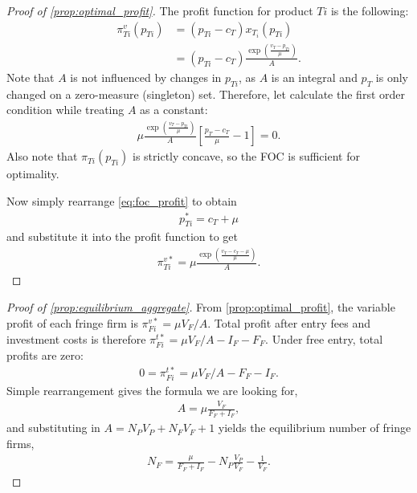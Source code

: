 \documentclass[a4paper]{article}
\begin{document}
\begin{proof}[Proof of \cref{prop:optimal_profit}]
    The profit function for product $Ti$ is the following:
    \begin{align*}
        \pi^v_{Ti}(p_{Ti}) &= (p_{Ti} - c_T) x_{T_i}(p_{Ti}) \\
        &= (p_{Ti} - c_T) \frac{\exp\left( \frac{v_T - p_{Ti}}{\mu} \right)}{A}.
    \end{align*}
    Note that $A$ is not influenced by changes in $p_{Ti}$, as $A$ is an integral and $p_T$ is only changed on a zero-measure (singleton) set.
    Therefore, let calculate the first order condition while treating $A$ as a constant:
    \begin{align}
        \label{eq:foc_profit}
        \mu \frac{\exp\left( \frac{v_T - p_{Ti}}{\mu} \right)}{A} \left[ \frac{p_T - c_T}{\mu} - 1 \right] = 0.
    \end{align}
    Also note that $\pi_{Ti}(p_{Ti})$ is strictly concave, so the FOC is sufficient for optimality.

    Now simply rearrange \cref{eq:foc_profit} to obtain
    \begin{align*}
        p_{Ti}^* = c_T + \mu
    \end{align*}
    and substitute it into the profit function to get
    \begin{align*}
        \pi_{Ti}^{v*} = \mu \frac{\exp \left( \frac{v_T - c_T - \mu}{\mu} \right)}{A}.
    \end{align*}
\end{proof}

\begin{proof}[Proof of \cref{prop:equilibrium_aggregate}]
    From \cref{prop:optimal_profit}, the variable profit of each fringe firm is $\pi_{Fi}^{v*} = \mu V_F / A$.
    Total profit after entry fees and investment costs is therefore $\pi_{Fi}^{t*} = \mu V_F / A - I_F - F_F$.
    Under free entry, total profits are zero:
    \begin{align*}
        0 = \pi_{Fi}^{t*} = \mu V_F / A - F_F - I_F.
    \end{align*}
    Simple rearrangement gives the formula we are looking for,
    \begin{align*}
        A = \mu \frac{V_F}{F_F + I_F},
    \end{align*}
    and substituting in $A = N_P V_P + N_F V_F + 1$ yields the equilibrium number of fringe firms,
    \begin{align*}
        N_F = \frac{\mu}{F_F + I_F} - N_P \frac{V_P}{V_F} - \frac{1}{V_F}.
    \end{align*}
\end{proof}
\end{document}
